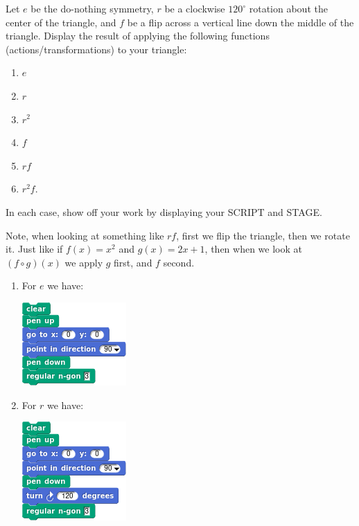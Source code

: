 \documentclass[noauthor,nooutcomes,12pt,hints]{ximera}
\begin{document}
\begin{question}
  Let $e$ be the do-nothing symmetry, $r$ be a clockwise $120^\circ$
  rotation about the center of the triangle, and $f$ be a flip across
  a vertical line down the middle of the triangle. Display the result
  of applying the following functions (actions/transformations) to
  your triangle:
  \begin{enumerate}
  \item $e$
  \item $r$
  \item $r^2$
  \item $f$
  \item $rf$
  \item $r^2 f$.
  \end{enumerate}
  In each case, show off your work by displaying your SCRIPT and
  STAGE.
  \begin{hint}
    Note, when looking at something like $rf$, first we flip the
    triangle, then we rotate it. Just like if $f(x) = x^2$ and $g(x) =
    2x+1$, then when we look at $(f\circ g)(x)$ we apply $g$ first,
    and $f$ second.
  \end{hint}
  \begin{freeResponse}
    \begin{enumerate}
    \item For $e$ we have:
      \begin{center}
        \includegraphics[width=.3\textwidth]{eTriSCRIPT.png}   \qquad {}
      \end{center}
    \item For $r$ we have:
      \begin{center}
        \includegraphics[width=.3\textwidth]{rTriSCRIPT.png}   \qquad {}

\end{center}
\end{enumerate}
\end{freeResponse}
\end{question}
\end{document}
